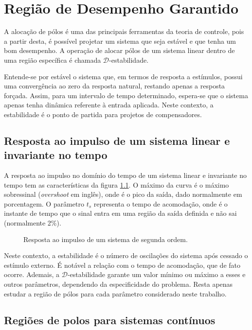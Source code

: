 \chapter{Região de Desempenho Garantido}

A alocação de pólos é uma das principais ferramentas da teoria de controle, pois a partir desta, é possível projetar um sistema que seja estável e que tenha um bom desempenho\cite{ROSINOVA2014}. A operação de alocar pólos de um sistema linear dentro de uma região específica é chamada $\mathscr{D}$-estabilidade\cite{CHILALI1996}.

Entende-se por estável o sistema que, em termos de resposta a estímulos, possui uma convergência ao zero da resposta natural, restando apenas a resposta forçada\cite{NISE2011}. Assim, para um intervalo de tempo determinado, espera-se que o sistema apenas tenha dinâmica referente à entrada aplicada. Neste contexto, a estabilidade é o ponto de partida para projetos de compensadores.

\section{Resposta ao impulso de um sistema linear e invariante no tempo}

A resposta ao impulso no domínio do tempo de um sistema linear e invariante no tempo tem as características da figura \ref{fig:ImpulseResponse}. O máximo da curva é o máximo sobressinal (\emph{overshoot} em inglês), onde é o pico da saída, dado normalmente em porcentagem. O parâmetro $t_s$ representa o tempo de acomodação, onde é o instante de tempo que o sinal entra em uma região da saída definida e não sai (normalmente 2\%).

\begin{figure}[!ht]
\centering

\caption{Resposta ao impulso de um sistema de segunda ordem.}
\label{fig:ImpulseResponse}
\end{figure}

Neste contexto, a estabilidade é o número de oscilações do sistema após cessado o estímulo externo. É notável a relação com o tempo de acomodação, que de fato ocorre. Ademais, a $\mathscr{D}$-estabilidade garante um valor mínimo ou máximo a esses e outros parâmetros, dependendo da especificidade do problema. Resta apenas estudar a região de pólos para cada parâmetro considerado neste trabalho.

\section{Regiões de polos para sistemas contínuos}\label{sec:DEstabilidadeS}

